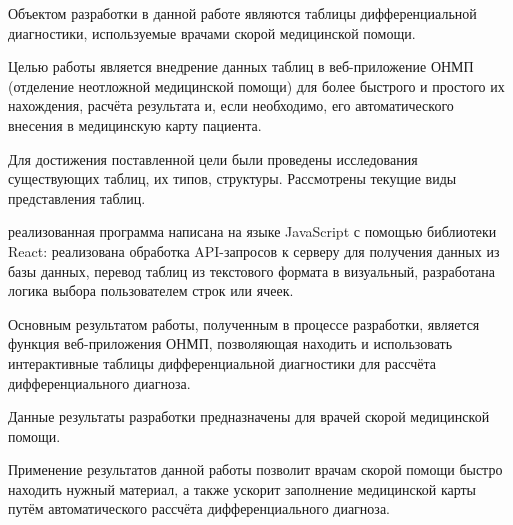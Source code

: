 \abstract %


Объектом разработки в данной работе являются таблицы дифференциальной диагностики, используемые врачами скорой медицинской помощи. 

Целью работы является внедрение данных таблиц в веб-приложение ОНМП (отделение неотложной медицинской помощи) для более быстрого и простого их нахождения, расчёта результата и, если необходимо, его автоматического внесения в медицинскую карту пациента.

Для достижения поставленной цели были проведены исследования существующих таблиц, их типов, структуры. Рассмотрены текущие виды представления таблиц. 

реализованная программа написана на языке JavaScript с помощью библиотеки React: реализована обработка API-запросов к серверу для получения данных из базы данных, перевод таблиц из текстового формата в визуальный, разработана логика выбора пользователем строк или ячеек.

Основным результатом работы, полученным в процессе разработки, является функция веб-приложения ОНМП, позволяющая находить и использовать интерактивные таблицы дифференциальной диагностики для рассчёта дифференциального диагноза. 

Данные результаты разработки предназначены для врачей скорой медицинской помощи.

Применение результатов данной работы позволит врачам скорой помощи быстро находить нужный материал, а также ускорит заполнение медицинской карты путём автоматического рассчёта дифференциального диагноза.